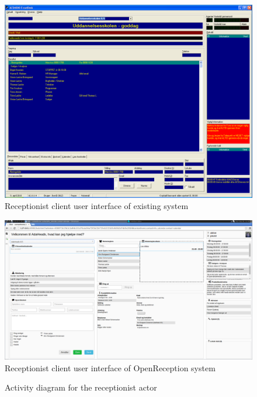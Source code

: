 \documentclass[10pt]{scrreprt}
\begin{document}
\begin{figure}
  \centering
 
  \includegraphics[scale=0.2]{img/frontdesk-client-ui.png}
  \caption{Receptionist client user interface of existing system}
  \label{fig:frontdesk-client-ui}
\end{figure}

\begin{figure}
  \includegraphics[scale=0.2]{img/openreception-client-ui.png}
  \caption{Receptionist client user interface of OpenReception system}
  \label{fig:openreception-client-ui}
\end{figure}

\begin{figure}[h]
\centering
\caption{Activity diagram for the receptionist actor}
\label{fig:activity_diagram_receptionist}
\end{figure}
\end{document}
